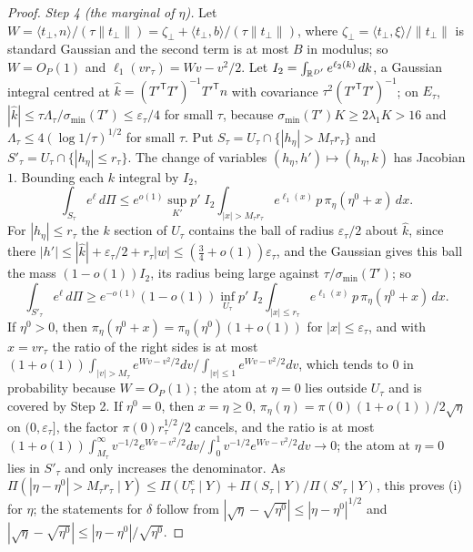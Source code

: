 \begin{proof}
\emph{Step 4 (the marginal of $\eta$).} Let $W=\langle t_\perp,n\rangle/(\tau\|t_\perp\|)=\zeta_\perp+\langle t_\perp,b\rangle/(\tau\|t_\perp\|)$, where $\zeta_\perp=\langle t_\perp,\xi\rangle/\|t_\perp\|$ is standard Gaussian and the second term is at most $B$ in modulus; so $W=O_P(1)$ and $\ell_1(vr_\tau)=Wv-v^2/2$. Let $I_2=\int_{\mathbb{R}^{D'}}e^{\ell_2(k)}\,dk$, a Gaussian integral centred at $\hat k=(T'^{\mathsf T}T')^{-1}T'^{\mathsf T}n$ with covariance $\tau^2(T'^{\mathsf T}T')^{-1}$; on $E_\tau$, $|\hat k|\le\tau\Lambda_\tau/\sigma_{\min}(T')\le\varepsilon_\tau/4$ for small $\tau$, because $\sigma_{\min}(T')K\ge2\lambda_1K>16$ and $\Lambda_\tau\le4(\log1/\tau)^{1/2}$ for small $\tau$. Put $S_\tau=U_\tau\cap\{|h_\eta|>M_\tau r_\tau\}$ and $S'_\tau=U_\tau\cap\{|h_\eta|\le r_\tau\}$. The change of variables $(h_\eta,h')\mapsto(h_\eta,k)$ has Jacobian $1$. Bounding each $k$ integral by $I_2$,
\[
\int_{S_\tau}e^\ell\,d\Pi\le e^{o(1)}\sup_{K'}p'\;I_2\int_{|x|>M_\tau r_\tau}e^{\ell_1(x)}\,p\,\pi_\eta(\eta^0+x)\,dx .
\]
For $|h_\eta|\le r_\tau$ the $k$ section of $U_\tau$ contains the ball of radius $\varepsilon_\tau/2$ about $\hat k$, since there $|h'|\le|\hat k|+\varepsilon_\tau/2+r_\tau|w|\le(\tfrac34+o(1))\varepsilon_\tau$, and the Gaussian gives this ball the mass $(1-o(1))I_2$, its radius being large against $\tau/\sigma_{\min}(T')$; so
\[
\int_{S'_\tau}e^\ell\,d\Pi\ge e^{-o(1)}(1-o(1))\inf_{U_\tau}p'\;I_2\int_{|x|\le r_\tau}e^{\ell_1(x)}\,p\,\pi_\eta(\eta^0+x)\,dx .
\]
If $\eta^0>0$, then $\pi_\eta(\eta^0+x)=\pi_\eta(\eta^0)(1+o(1))$ for $|x|\le\varepsilon_\tau$, and with $x=vr_\tau$ the ratio of the right sides is at most $(1+o(1))\int_{|v|>M_\tau}e^{Wv-v^2/2}dv\big/\int_{|v|\le1}e^{Wv-v^2/2}dv$, which tends to $0$ in probability because $W=O_P(1)$; the atom at $\eta=0$ lies outside $U_\tau$ and is covered by Step 2. If $\eta^0=0$, then $x=\eta\ge0$, $\pi_\eta(\eta)=\pi(0)(1+o(1))/2\sqrt\eta$ on $(0,\varepsilon_\tau]$, the factor $\pi(0)r_\tau^{1/2}/2$ cancels, and the ratio is at most $(1+o(1))\int_{M_\tau}^\infty v^{-1/2}e^{Wv-v^2/2}dv\big/\int_0^1v^{-1/2}e^{Wv-v^2/2}dv\to0$; the atom at $\eta=0$ lies in $S'_\tau$ and only increases the denominator. As $\Pi(|\eta-\eta^0|>M_\tau r_\tau\mid Y)\le\Pi(U_\tau^c\mid Y)+\Pi(S_\tau\mid Y)/\Pi(S'_\tau\mid Y)$, this proves (i) for $\eta$; the statements for $\delta$ follow from $|\sqrt\eta-\sqrt{\eta^0}|\le|\eta-\eta^0|^{1/2}$ and $|\sqrt\eta-\sqrt{\eta^0}|\le|\eta-\eta^0|/\sqrt{\eta^0}$.


\end{proof}
